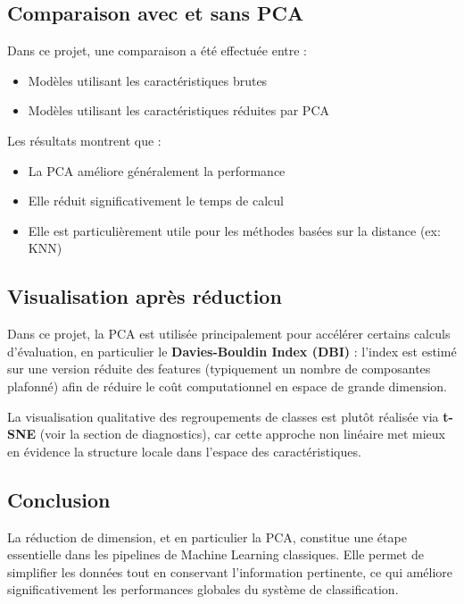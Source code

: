 \documentclass[12pt,a4paper]{article}
\begin{document}
    \subsection{Comparaison avec et sans PCA}

        Dans ce projet, une comparaison a été effectuée entre :
        \begin{itemize}
            \item Modèles utilisant les caractéristiques brutes
            \item Modèles utilisant les caractéristiques réduites par PCA
        \end{itemize}

        Les résultats montrent que :
        \begin{itemize}
            \item La PCA améliore généralement la performance
            \item Elle réduit significativement le temps de calcul
            \item Elle est particulièrement utile pour les méthodes basées sur la distance (ex: KNN)
        \end{itemize}

    \subsection{Visualisation après réduction}

        Dans ce projet, la PCA est utilisée principalement pour accélérer certains calculs d’évaluation, en particulier le \textbf{Davies-Bouldin Index (DBI)} : l’index est estimé sur une version réduite des features (typiquement un nombre de composantes plafonné) afin de réduire le coût computationnel en espace de grande dimension.

        La visualisation qualitative des regroupements de classes est plutôt réalisée via \textbf{t-SNE} (voir la section de diagnostics), car cette approche non linéaire met mieux en évidence la structure locale dans l’espace des caractéristiques.

    \subsection{Conclusion}

        La réduction de dimension, et en particulier la PCA, constitue une étape essentielle dans les pipelines de Machine Learning classiques.
        Elle permet de simplifier les données tout en conservant l’information pertinente, ce qui améliore significativement les performances globales du système de classification.
\end{document}
